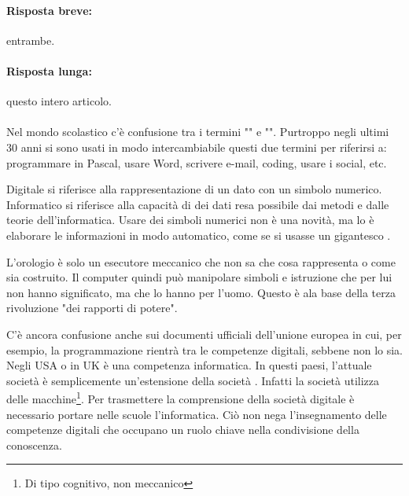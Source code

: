 \paragraph{Risposta breve:} entrambe.

\paragraph{Risposta lunga:} questo intero articolo.
\paragraph{}
Nel mondo scolastico c'è confusione tra i termini "" e "". Purtroppo negli ultimi 30 anni si sono usati in modo intercambiabile questi due termini per riferirsi a: programmare in Pascal, usare Word, scrivere e-mail,  coding, usare i social, etc.

Digitale si riferisce alla rappresentazione di un dato con un simbolo numerico. Informatico si riferisce alla capacità di  dei dati resa possibile dai metodi e dalle teorie dell'informatica. Usare dei simboli numerici non è una novità, ma lo è elaborare le informazioni in modo automatico, come se si usasse un gigantesco .

L'orologio è solo un esecutore meccanico che non sa che cosa rappresenta o come sia costruito. Il computer quindi può manipolare simboli e istruzione che per lui non hanno significato, ma che lo hanno per l'uomo. Questo è ala base della terza rivoluzione "dei rapporti di potere".

C'è ancora confusione anche sui documenti ufficiali dell'unione europea in cui, per esempio, la programmazione rientrà tra le competenze digitali, sebbene non lo sia. Negli USA o in UK è una competenza informatica. In questi paesi, l'attuale società è semplicemente un'estensione della società . Infatti la società  utilizza delle macchine\footnote{Di tipo cognitivo, non meccanico}. Per trasmettere la comprensione della società digitale è necessario portare nelle scuole l'informatica. Ciò non nega l'insegnamento delle competenze digitali che occupano un ruolo chiave nella condivisione della conoscenza.
